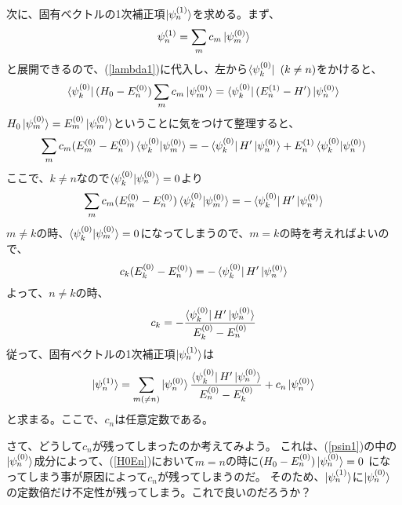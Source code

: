 次に、固有ベクトルの1次補正項$\ket{\psi_n^{(1)}}$を求める。まず、
\begin{equation}
  \label{psin1}
  \psi_n^{(1)} = \sum_m c_m \ket{\psi_m^{(0)}}
\end{equation}
と展開できるので、(\ref{lambda1})に代入し、左から$\bra{\psi_k^{(0)}}~(k \neq n)$をかけると、
\begin{equation}
  \label{H0En}
  \bra{\psi_k^{(0)}}(H_0 - E_n^{(0)}) \sum_m c_m \ket{\psi_m^{(0)}} = \bra{\psi_k^{(0)}}(E_n^{(1)} - H')\ket{\psi_n^{(0)}}
\end{equation}
$H_0\ket{\psi_m^{(0)}} = E_m^{(0)}\ket{\psi_m^{(0)}}$ということに気をつけて整理すると、
\begin{equation}
  \sum_m c_m (E_m^{(0)} - E_n^{(0)}) \braket{\psi_k^{(0)}|\psi_m^{(0)}} = - \bra{\psi_k^{(0)}} H' \ket{\psi_n^{(0)}} +  E_n^{(1)} \braket{\psi_k^{(0)}|\psi_n^{(0)}}
\end{equation}
ここで、$k \neq n$なので$\braket{\psi_k^{(0)}|\psi_n^{(0)}} = 0$より
\begin{equation}
  \sum_m c_m (E_m^{(0)} - E_n^{(0)}) \braket{\psi_k^{(0)}|\psi_m^{(0)}} = - \bra{\psi_k^{(0)}} H' \ket{\psi_n^{(0)}}
\end{equation}
$m \neq k$の時、$\braket{\psi_k^{(0)}|\psi_m^{(0)}} = 0$になってしまうので、$m = k$の時を考えればよいので、
\begin{equation}
  c_k (E_k^{(0)} - E_n^{(0)}) = - \bra{\psi_k^{(0)}} H' \ket{\psi_n^{(0)}}
\end{equation}
よって、$n \neq k$の時、
\begin{equation}
  c_k = - \dfrac{\bra{\psi_k^{(0)}} H' \ket{\psi_n^{(0)}}}{E_k^{(0)} - E_n^{(0)}}
\end{equation}
従って、固有ベクトルの1次補正項$\ket{\psi_n^{(1)}}$は
\begin{equation}
  \ket{\psi_n^{(1)}} = \sum_{m(\neq n)} \ket{\psi_n^{(0)}} \dfrac{\bra{\psi_k^{(0)}} H' \ket{\psi_n^{(0)}}}{E_n^{(0)} - E_k^{(0)}} + c_n\ket{\psi_n^{(0)}}
\end{equation}
と求まる。ここで、$c_n$は任意定数である。

さて、どうして$c_n$が残ってしまったのか考えてみよう。
これは、(\ref{psin1})の中の$\ket{\psi_n^{(0)}}$成分によって、(\ref{H0En})において$m = n$の時に$(H_0 - E_n^{(0)})\ket{\psi_n^{(0)}} = 0$
になってしまう事が原因によって$c_n$が残ってしまうのだ。
そのため、$\ket{\psi_n^{(1)}}$に$\ket{\psi_n^{(0)}}$の定数倍だけ不定性が残ってしまう。これで良いのだろうか？

